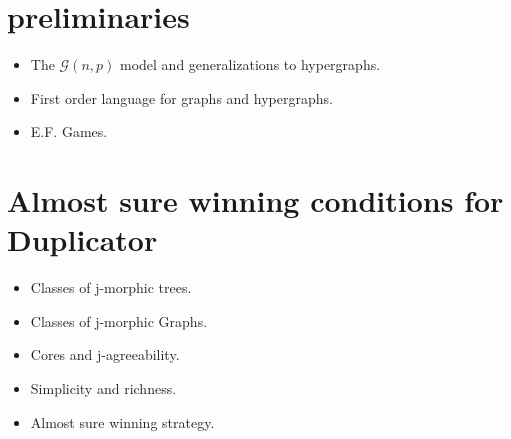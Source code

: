 \documentclass[oneside, 11pt, letterpaper]{report}
\begin{document}
\tableofcontents

\chapter{preliminaries}

\begin{itemize}
	\item The $\mathcal{G}(n,p)$ model and generalizations to hypergraphs. 
	\item First order language for graphs and hypergraphs.
	\item E.F. Games.
\end{itemize}


\chapter{Almost sure winning conditions for Duplicator}

\begin{itemize}
	\item Classes of j-morphic trees.
	\item Classes of j-morphic Graphs.
	\item Cores and j-agreeability.
	\item Simplicity and richness.
	\item Almost sure winning strategy.
	
\end{itemize}
\end{document}
